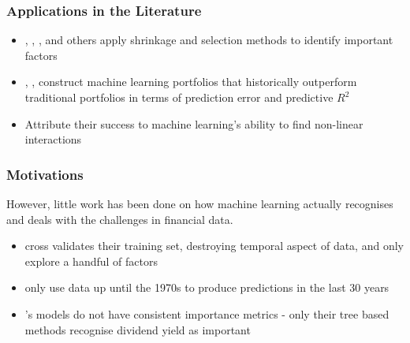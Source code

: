 \documentclass[]{beamer}
\begin{document}


\begin{frame}
\frametitle{Applications in the Literature}
\begin{itemize}
	\item \cite{kozak_shrinking_2017}, \cite{rapach_forecasting_2013}, \cite{freyberger_dissecting_2017}, and others apply shrinkage and selection methods to identify important factors
	\item \cite{gu_empirical_2018}, \cite{feng_deep_2018}, construct machine learning portfolios that historically outperform traditional portfolios in terms of prediction error and predictive $R^2$
	\item Attribute their success to machine learning's ability to find non-linear interactions
\end{itemize}
\end{frame}

\begin{frame}
\frametitle{Motivations}
However, little work has been done on how machine learning actually recognises and deals with the challenges in financial data. 
\begin{itemize}
	\item \cite{feng_deep_2018} cross validates their training set, destroying temporal aspect of data, and only explore a handful of factors
	\item \cite{gu_empirical_2018} only use data up until the 1970s to produce predictions in the last 30 years
	\item \cite{gu_empirical_2018}'s models do not have consistent importance metrics - only their tree based methods recognise dividend yield as important
\end{itemize}
\end{frame}
\end{document}
